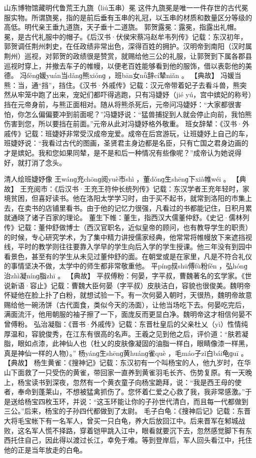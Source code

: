 \documentclass[12pt,UTF8]{ctexbook}
\begin{document}
山东博物馆藏明代鲁荒王九旒（liú玉串）冕
这件九旒冕是唯一一件存世的古代冕服实物。所谓旒冕，指的是前后垂有玉串的礼冠，以玉串的材质和数量区分等级的高低。明代亲王垂九道旒，天子垂十二道旒。
郭贺露冕：露冕，指露出礼帽。冕，是古代礼服中的帽子。《后汉书·伏侯宋蔡冯赵牟韦列传》记载：东汉初年，郭贺调任荆州刺史，在任政绩非常出色，深得百姓的拥护。汉明帝到南阳（汉时属荆州）巡视，对郭贺的政绩很是赞赏，就赐给他三公的礼服，让郭贺到下属各郡县巡视时穿上，并撤去车子的帷幔，以便老百姓能够看到他的服饰，借以表彰他的美德。
冯fénɡ媛yuán当dǎnɡ熊xiónɡ
，班bān女nǚ辞cí辇niǎn
。
【典故】
冯媛当熊：当，通“挡”，挡住。《汉书·外戚传》记载：汉元帝带着妃子去看斗兽，熊突然从牢笼中跑了出来，宠妃们都吓得逃跑，只有冯婕妤（jié yú，宫中嫔妃的称号）挡在元帝身前，与熊正面相对。随从将熊杀死后，元帝问冯婕妤：“大家都很害怕，你怎么偏偏要冲到前面呢？”冯婕妤说：“猛兽捕捉到人就会停止向前，我怕熊伤害到您，所以要挡在前面。”元帝从此对冯婕妤格外敬重。
班女辞辇：《汉书·外戚传》记载：班婕妤非常受汉成帝宠爱。成帝在后宫游玩，让班婕妤上自己的车，班婕妤说：“我看过古代的图画，圣贤君主身边都是名臣，只有亡国之君身边画的才是嫔妃。我和您如果同辇，是不是和后一种情况有些像呢？”成帝认为她说得好，就打消了念头。

清人绘班婕妤像
王wánɡ充chōnɡ阅yuè市shì
，董dǒnɡ生shēnɡ下xià帷wéi
。
【典故】
王充阅市：《后汉书·王充王符仲长统列传》记载：东汉学者王充年轻时，家境贫困，但喜好读书。他在洛阳太学学习时，由于买不起书，就常到洛阳的市集上去，在卖书的店铺里看书。由于他的记忆力很强，凡看过的书都能记住，日积月累就通晓了诸子百家的理论。
董生下帷：董生，指西汉大儒董仲舒。《史记·儒林列传》记载：董仲舒做博士（西汉官职名，近似皇帝的顾问，也有教导学生的职责）的时候，专心研究学术，为了集中精力讲授儒家经典，他常常将帷幔放下来遮挡视线，平时的教学则往往要靠入学早的学生向后入学的学生授课。他三年没有到园中看景色，甚至有的学生从未见过董仲舒的面。在朝堂或是在家里，凡是不符合礼仪的事情坚决不做，太学中的师生都非常敬重他。
平pínɡ叔shū傅fù粉fěn
，弘hónɡ治zhì凝nínɡ脂zhī
。
【典故】
平叔傅粉：何晏，字平叔，曹魏著名的玄学家。《世说新语·容止》记载：曹魏大臣何晏（字平叔）皮肤洁白，容貌也很俊美。魏明帝怀疑他在脸上扑了白粉，就想试验一下。有一次何晏入朝时，天很热，魏明帝故意赐给他一碗汤饼（古代面食，类似今天的汤面），让他当场吃下去。何晏吃完后，满面流汗，他用朝服的袖子擦了一下，面庞反而更显白净。魏明帝这才相信何晏不曾傅粉。
弘治凝脂：《晋书·外戚传》记载：东晋杜皇后的父亲杜乂（yì）性情纯厚温和，容貌俊秀，在江东有很高的名声。王羲之见到他之后，评价道：“肤若凝脂，眼如点漆，此神仙人也（杜乂的皮肤像凝固的油脂一样白，眼睛像漆一样黑，真是神仙一样的人物）。”
杨yánɡ生shēnɡ黄huánɡ雀què
，毛máo子zǐ白bái龟ɡuī
。
【典故】
杨生黄雀：《搜神记》记载：东汉初有一个叫杨宝的人，他九岁时，在华山下面救了一只受伤的黄雀，带回家一直养到黄雀羽毛长齐、伤势复原。有一天晚上，杨宝读书到深夜，忽然有一个黄衣童子向杨宝跪拜，说：“我是西王母的使者，奉命到蓬莱山，不想被猛禽抓伤了。您怀着仁爱之心救了我，我非常感激。”于是送给杨宝四枚玉环，并说：“这玉环能让你的子孙世代清白，而且每一代都做到三公。”后来，杨宝的子孙四代都做到了太尉。
毛子白龟：《搜神后记》记载：东晋大将毛宝帐下有一名军人，曾买一只白龟，养大后放回江中。后来晋军在邾城战败，这名军人慌不择路，穿着铠甲跳入江中，眼看就要沉下去，忽然感觉脚下有东西托住自己，因此得以渡过长江，幸免于难。等到登岸后，军人回头看江中，托住他的正是当年放走的白龟。
\end{document}
